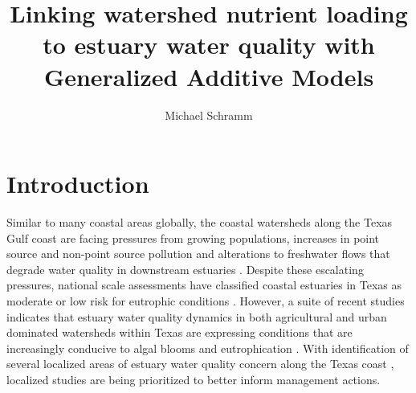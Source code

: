 \documentclass[fleqn,10pt,lineno]{wlpeerj} %
\title{Linking watershed nutrient loading to estuary water quality with
Generalized Additive Models} %
\author[1]{Michael Schramm}
\affil[1]{Texas Water Resources Institute, Texas A\&M AgriLife Research,
College Station, Texas, United States}
\begin{document}
\flushbottom
\maketitle
\thispagestyle{empty}

\hypertarget{introduction}{%
\section*{Introduction}\label{introduction}}

Similar to many coastal areas globally, the coastal watersheds along the
Texas Gulf coast are facing pressures from growing populations,
increases in point source and non-point source pollution and alterations
to freshwater flows that degrade water quality in downstream estuaries
\autocite{bricker_effects_2008,kennicuttWaterQualityGulf2017,bugica_water_2020}.
Despite these escalating pressures, national scale assessments have
classified coastal estuaries in Texas as moderate or low risk for
eutrophic conditions \autocite{bricker_effects_2008}. However, a suite
of recent studies indicates that estuary water quality dynamics in both
agricultural and urban dominated watersheds within Texas are expressing
conditions that are increasingly conducive to algal blooms and
eutrophication
\autocite{wetzWaterQualityDynamics2016,wetz_exceptionally_2017,bugica_water_2020,chinPhytoplanktonBiomassCommunity2022}.
With identification of several localized areas of estuary water quality
concern along the Texas coast \autocite{bugica_water_2020}, localized
studies are being prioritized to better inform management actions.
\end{document}
